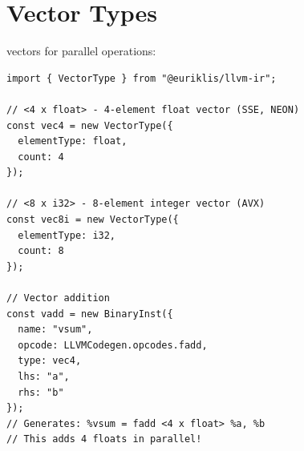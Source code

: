 \section{Vector Types}

 vectors for parallel operations:

\begin{lstlisting}[style=ts]
import { VectorType } from "@euriklis/llvm-ir";

// <4 x float> - 4-element float vector (SSE, NEON)
const vec4 = new VectorType({
  elementType: float,
  count: 4
});

// <8 x i32> - 8-element integer vector (AVX)
const vec8i = new VectorType({
  elementType: i32,
  count: 8
});

// Vector addition
const vadd = new BinaryInst({
  name: "vsum",
  opcode: LLVMCodegen.opcodes.fadd,
  type: vec4,
  lhs: "a",
  rhs: "b"
});
// Generates: %vsum = fadd <4 x float> %a, %b
// This adds 4 floats in parallel!
\end{lstlisting}


